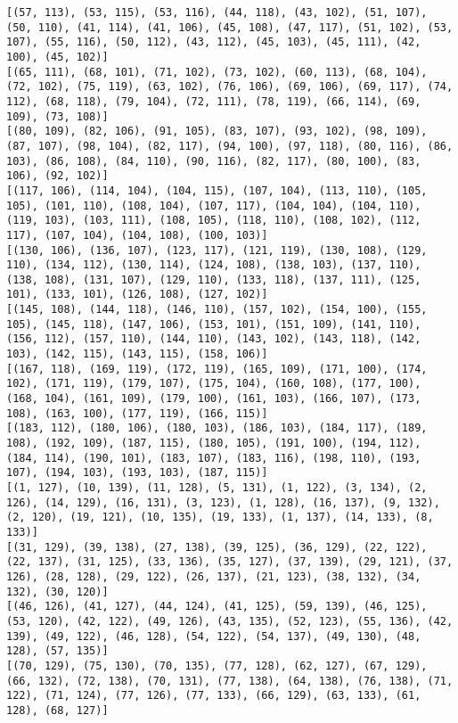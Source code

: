 \documentclass[11pt]{article}
\begin{document}
\begin{Verbatim}[commandchars=\\\{\}]
[(57, 113), (53, 115), (53, 116), (44, 118), (43, 102), (51, 107), (50, 110), (41, 114), (41, 106), (45, 108), (47, 117), (51, 102), (53, 107), (55, 116), (50, 112), (43, 112), (45, 103), (45, 111), (42, 100), (45, 102)]
[(65, 111), (68, 101), (71, 102), (73, 102), (60, 113), (68, 104), (72, 102), (75, 119), (63, 102), (76, 106), (69, 106), (69, 117), (74, 112), (68, 118), (79, 104), (72, 111), (78, 119), (66, 114), (69, 109), (73, 108)]
[(80, 109), (82, 106), (91, 105), (83, 107), (93, 102), (98, 109), (87, 107), (98, 104), (82, 117), (94, 100), (97, 118), (80, 116), (86, 103), (86, 108), (84, 110), (90, 116), (82, 117), (80, 100), (83, 106), (92, 102)]
[(117, 106), (114, 104), (104, 115), (107, 104), (113, 110), (105, 105), (101, 110), (108, 104), (107, 117), (104, 104), (104, 110), (119, 103), (103, 111), (108, 105), (118, 110), (108, 102), (112, 117), (107, 104), (104, 108), (100, 103)]
[(130, 106), (136, 107), (123, 117), (121, 119), (130, 108), (129, 110), (134, 112), (130, 114), (124, 108), (138, 103), (137, 110), (138, 108), (131, 107), (129, 110), (133, 118), (137, 111), (125, 101), (133, 101), (126, 108), (127, 102)]
[(145, 108), (144, 118), (146, 110), (157, 102), (154, 100), (155, 105), (145, 118), (147, 106), (153, 101), (151, 109), (141, 110), (156, 112), (157, 110), (144, 110), (143, 102), (143, 118), (142, 103), (142, 115), (143, 115), (158, 106)]
[(167, 118), (169, 119), (172, 119), (165, 109), (171, 100), (174, 102), (171, 119), (179, 107), (175, 104), (160, 108), (177, 100), (168, 104), (161, 109), (179, 100), (161, 103), (166, 107), (173, 108), (163, 100), (177, 119), (166, 115)]
[(183, 112), (180, 106), (180, 103), (186, 103), (184, 117), (189, 108), (192, 109), (187, 115), (180, 105), (191, 100), (194, 112), (184, 114), (190, 101), (183, 107), (183, 116), (198, 110), (193, 107), (194, 103), (193, 103), (187, 115)]
[(1, 127), (10, 139), (11, 128), (5, 131), (1, 122), (3, 134), (2, 126), (14, 129), (16, 131), (3, 123), (1, 128), (16, 137), (9, 132), (2, 120), (19, 121), (10, 135), (19, 133), (1, 137), (14, 133), (8, 133)]
[(31, 129), (39, 138), (27, 138), (39, 125), (36, 129), (22, 122), (22, 137), (31, 125), (33, 136), (35, 127), (37, 139), (29, 121), (37, 126), (28, 128), (29, 122), (26, 137), (21, 123), (38, 132), (34, 132), (30, 120)]
[(46, 126), (41, 127), (44, 124), (41, 125), (59, 139), (46, 125), (53, 120), (42, 122), (49, 126), (43, 135), (52, 123), (55, 136), (42, 139), (49, 122), (46, 128), (54, 122), (54, 137), (49, 130), (48, 128), (57, 135)]
[(70, 129), (75, 130), (70, 135), (77, 128), (62, 127), (67, 129), (66, 132), (72, 138), (70, 131), (77, 138), (64, 138), (76, 138), (71, 122), (71, 124), (77, 126), (77, 133), (66, 129), (63, 133), (61, 128), (68, 127)]

\end{Verbatim}
\end{document}
